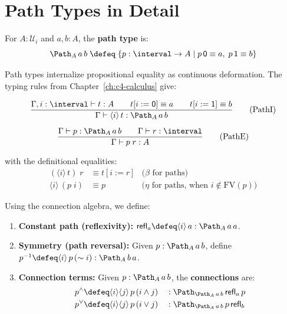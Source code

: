 \section{Path Types in Detail}
\label{sec:path-types}

\begin{definition}
For $A : \mathcal{U}_i$ and $a, b : A$, the \textbf{path type} is:
\[
  \Path_A\, a\, b \;\defeq\;
  \{p : \interval \to A \mid p\,\mathsf{0} \equiv a,\;
    p\,\mathsf{1} \equiv b\}
\]
\end{definition}

\noindent
Path types internalize propositional equality as continuous deformation.
The typing rules from Chapter~\ref{ch:c4-calculus} give:

\begin{gather}
\frac{\Gamma, i : \interval \vdash t : A \qquad
      t[i := \mathsf{0}] \equiv a \qquad t[i := \mathsf{1}] \equiv b}
     {\Gamma \vdash \langle i \rangle\, t : \Path_A\, a\, b}
\tag{PathI}
\\[6pt]
\frac{\Gamma \vdash p : \Path_A\, a\, b \qquad
      \Gamma \vdash r : \interval}
     {\Gamma \vdash p\; r : A}
\tag{PathE}
\end{gather}

with the definitional equalities:
\begin{align}
  (\langle i \rangle\, t)\; r &\equiv t[i := r]
    & \text{($\beta$ for paths)} \tag{Path-$\beta$} \\
  \langle i \rangle\, (p\; i) &\equiv p
    & \text{($\eta$ for paths, when $i \notin \mathrm{FV}(p)$)}
    \tag{Path-$\eta$}
\end{align}

\begin{definition}
\label{def:path-ops}
Using the connection algebra, we define:
\begin{enumerate}
\item \textbf{Constant path (reflexivity):}
  $\mathsf{refl}_a \defeq \langle i \rangle\, a : \Path_A\, a\, a$.

\item \textbf{Symmetry (path reversal):}
  Given $p : \Path_A\, a\, b$, define
  $p^{-1} \defeq \langle i \rangle\, p\,(\sim i) : \Path_A\, b\, a$.

\item \textbf{Connection terms:}
  Given $p : \Path_A\, a\, b$, the \textbf{connections} are:
  \begin{align*}
    p^{\wedge} &\defeq \langle i \rangle\langle j \rangle\,
      p\,(i \wedge j) &&: \Path_{\Path_A\, a\, b}\,
      \mathsf{refl}_a\, p \\
    p^{\vee} &\defeq \langle i \rangle\langle j \rangle\,
      p\,(i \vee j) &&: \Path_{\Path_A\, a\, b}\,
      p\, \mathsf{refl}_b
  \end{align*}
\end{enumerate}
\end{definition}


